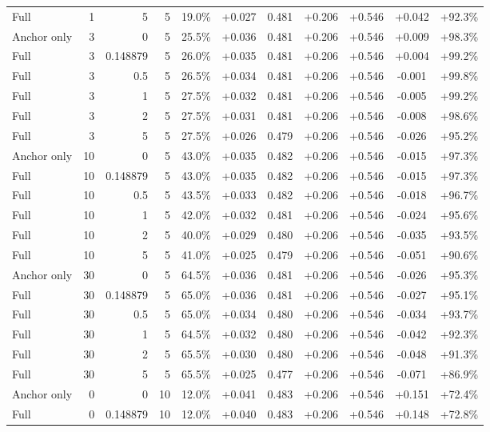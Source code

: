 \begin{table}[htbp]
\begin{tabular}{lrrrccccccc}
Full & 1 & 5 & 5 & 19.0\% & +0.027 & 0.481 & +0.206 & +0.546 & +0.042 & +92.3\% \\
Anchor only & 3 & 0 & 5 & 25.5\% & +0.036 & 0.481 & +0.206 & +0.546 & +0.009 & +98.3\% \\
Full & 3 & 0.148879 & 5 & 26.0\% & +0.035 & 0.481 & +0.206 & +0.546 & +0.004 & +99.2\% \\
Full & 3 & 0.5 & 5 & 26.5\% & +0.034 & 0.481 & +0.206 & +0.546 & -0.001 & +99.8\% \\
Full & 3 & 1 & 5 & 27.5\% & +0.032 & 0.481 & +0.206 & +0.546 & -0.005 & +99.2\% \\
Full & 3 & 2 & 5 & 27.5\% & +0.031 & 0.481 & +0.206 & +0.546 & -0.008 & +98.6\% \\
Full & 3 & 5 & 5 & 27.5\% & +0.026 & 0.479 & +0.206 & +0.546 & -0.026 & +95.2\% \\
Anchor only & 10 & 0 & 5 & 43.0\% & +0.035 & 0.482 & +0.206 & +0.546 & -0.015 & +97.3\% \\
Full & 10 & 0.148879 & 5 & 43.0\% & +0.035 & 0.482 & +0.206 & +0.546 & -0.015 & +97.3\% \\
Full & 10 & 0.5 & 5 & 43.5\% & +0.033 & 0.482 & +0.206 & +0.546 & -0.018 & +96.7\% \\
Full & 10 & 1 & 5 & 42.0\% & +0.032 & 0.481 & +0.206 & +0.546 & -0.024 & +95.6\% \\
Full & 10 & 2 & 5 & 40.0\% & +0.029 & 0.480 & +0.206 & +0.546 & -0.035 & +93.5\% \\
Full & 10 & 5 & 5 & 41.0\% & +0.025 & 0.479 & +0.206 & +0.546 & -0.051 & +90.6\% \\
Anchor only & 30 & 0 & 5 & 64.5\% & +0.036 & 0.481 & +0.206 & +0.546 & -0.026 & +95.3\% \\
Full & 30 & 0.148879 & 5 & 65.0\% & +0.036 & 0.481 & +0.206 & +0.546 & -0.027 & +95.1\% \\
Full & 30 & 0.5 & 5 & 65.0\% & +0.034 & 0.480 & +0.206 & +0.546 & -0.034 & +93.7\% \\
Full & 30 & 1 & 5 & 64.5\% & +0.032 & 0.480 & +0.206 & +0.546 & -0.042 & +92.3\% \\
Full & 30 & 2 & 5 & 65.5\% & +0.030 & 0.480 & +0.206 & +0.546 & -0.048 & +91.3\% \\
Full & 30 & 5 & 5 & 65.5\% & +0.025 & 0.477 & +0.206 & +0.546 & -0.071 & +86.9\% \\
Anchor only & 0 & 0 & 10 & 12.0\% & +0.041 & 0.483 & +0.206 & +0.546 & +0.151 & +72.4\% \\
Full & 0 & 0.148879 & 10 & 12.0\% & +0.040 & 0.483 & +0.206 & +0.546 & +0.148 & +72.8\% \\

\end{tabular}
\end{table}
